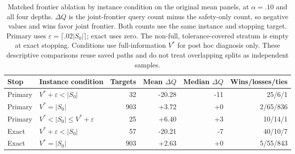 \begin{table}[t]
\centering\small
\begin{tabular}{llrrrr}
\toprule
Stop & Instance condition & Targets & Mean $\Delta Q$ & Median $\Delta Q$ & Wins/losses/ties\\
\midrule
Primary & $V^*+\varepsilon<|S_0|$ & 32 & -20.28 & -11 & 25/6/1 \\
Primary & $V^*=|S_0|$ & 903 & +3.72 & +0 & 2/65/836 \\
Primary & $V^*<|S_0|\le V^*+\varepsilon$ & 25 & +6.40 & +3 & 10/14/1 \\
Exact & $V^*+\varepsilon<|S_0|$ & 57 & -20.21 & -7 & 40/10/7 \\
Exact & $V^*=|S_0|$ & 903 & +2.63 & +0 & 5/55/843 \\
\bottomrule
\end{tabular}
\caption{Matched frontier ablation by instance condition on the original mean panels, at $\alpha=.10$ and all four depths. $\Delta Q$ is the joint-frontier query count minus the safety-only count, so negative values and wins favor joint frontier. Both counts use the same instance and stopping target. Primary uses $\varepsilon=\lceil.02|S_0|\rceil$; exact uses zero. The non-full, tolerance-covered stratum is empty at exact stopping. Conditions use full-information $V^*$ for post hoc diagnosis only. These descriptive comparisons reuse saved paths and do not treat overlapping splits as independent samples.}
\label{tab:frontier-strata}
\end{table}
